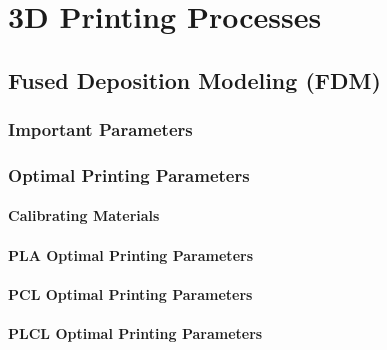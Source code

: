 \section{3D Printing Processes\label{sec:literatureReview:printing}}

\subsection{Fused Deposition Modeling (FDM)\label{sec:literatureReview:printing:FDM}}

\subsubsection{Important Parameters\label{sec:literatureReview:printing:FDM:parameters}}

\subsubsection{Optimal Printing Parameters\label{sec:literatureReview:printing:FDM:optimalParameters}}

\paragraph*{Calibrating Materials}

\paragraph*{PLA Optimal Printing Parameters}

\paragraph*{PCL Optimal Printing Parameters}

\paragraph*{PLCL Optimal Printing Parameters}
